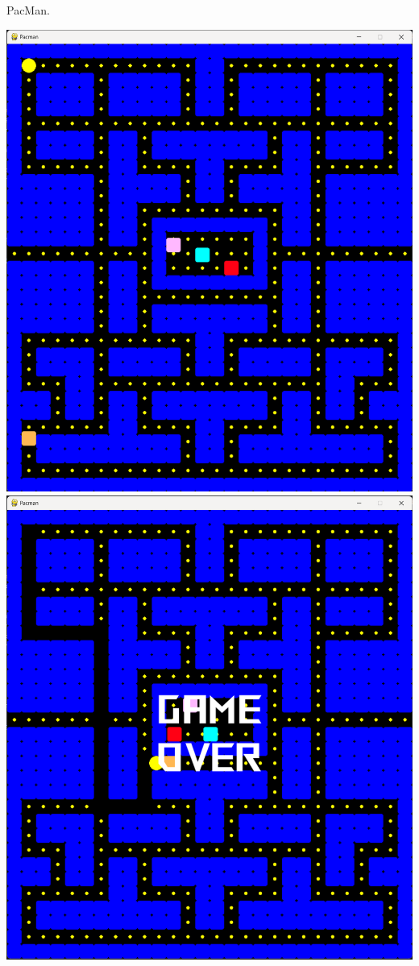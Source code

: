 \documentclass[a4paper,14pt]{extarticle}
\begin{document}
PacMan.\\
\begin{center}
    \includegraphics[width=140mm]{game1.png}
    \includegraphics[width=140mm]{game2.png}
\end{center}
\end{document}

